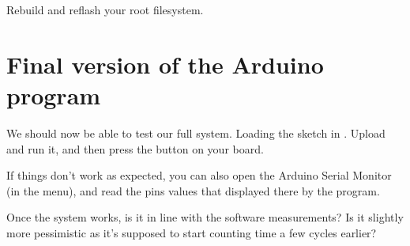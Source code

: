 Rebuild and reflash your root filesystem.

\section{Final version of the Arduino program}

We should now be able to test our full system.  Loading the sketch in
. Upload and run it, and then
press the  button on your board.

If things don't work as expected, you can also open the Arduino Serial
Monitor (in the  menu), and read the pins values that
displayed there by the program.

Once the system works, is it in line with the software measurements?
Is it slightly more pessimistic as it's supposed to start counting
time a few cycles earlier?

